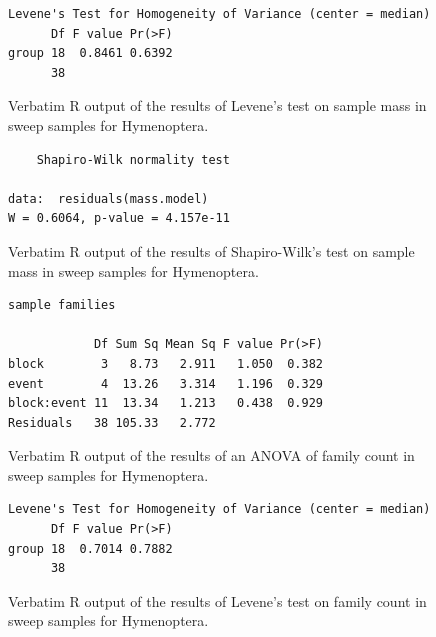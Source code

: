 \documentclass[10pt,letterpaper,twocolumn]{article}
\begin{document}
\begin{figure}[h]
	\lstset{numbers=left}
	\lstset{xleftmargin=5mm,framexleftmargin=5mm}
	\begin{lstlisting}
Levene's Test for Homogeneity of Variance (center = median)
      Df F value Pr(>F)
group 18  0.8461 0.6392
      38               
	\end{lstlisting}
	\caption{Verbatim R output of the results of Levene's test on sample mass in sweep samples for Hymenoptera.}
	\label{fig:sweep_hymenoptera_mass_levene}
	\smallskip
	\nointerlineskip
	\hrulefill
\end{figure}

\begin{figure}[h]
	\lstset{numbers=left}
	\lstset{xleftmargin=5mm,framexleftmargin=5mm}
	\begin{lstlisting}
	Shapiro-Wilk normality test

data:  residuals(mass.model)
W = 0.6064, p-value = 4.157e-11
	\end{lstlisting}
	\caption{Verbatim R output of the results of Shapiro-Wilk's test on sample mass in sweep samples for Hymenoptera.}
	\label{fig:sweep_hymenoptera_mass_shapiro}
	\smallskip
	\nointerlineskip
	\hrulefill
\end{figure}

\begin{figure}[h]
	\lstset{numbers=left}
	\lstset{xleftmargin=5mm,framexleftmargin=5mm}
	\begin{lstlisting}
sample families 

            Df Sum Sq Mean Sq F value Pr(>F)
block        3   8.73   2.911   1.050  0.382
event        4  13.26   3.314   1.196  0.329
block:event 11  13.34   1.213   0.438  0.929
Residuals   38 105.33   2.772               
	\end{lstlisting}
	\caption{Verbatim R output of the results of an ANOVA of family count in sweep samples for Hymenoptera.}
	\label{fig:sweep_hymenoptera_family_anova}
	\smallskip
	\nointerlineskip
	\hrulefill
\end{figure}

\begin{figure}[h]
	\lstset{numbers=left}
	\lstset{xleftmargin=5mm,framexleftmargin=5mm}
	\begin{lstlisting}
Levene's Test for Homogeneity of Variance (center = median)
      Df F value Pr(>F)
group 18  0.7014 0.7882
      38               
	\end{lstlisting}
	\caption{Verbatim R output of the results of Levene's test on family count in sweep samples for Hymenoptera.}
	\label{fig:sweep_hymenoptera_family_levene}
	\smallskip
	\nointerlineskip
	\hrulefill
\end{figure}
\end{document}
